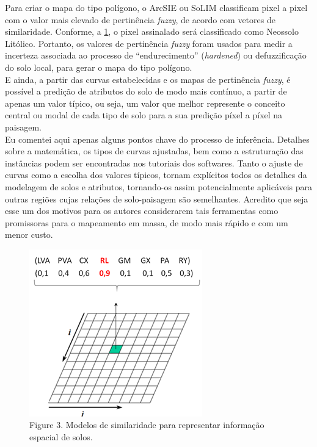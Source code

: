 Para criar o mapa do tipo polígono, o ArcSIE ou SoLIM classificam pixel a pixel com o valor mais elevado de pertinência \emph{fuzzy}, de acordo com vetores de similaridade. Conforme, a \ref{fig:figura3}, o pixel assinalado será classificado como Neossolo Litólico. Portanto, os valores de pertinência \emph{fuzzy} foram usados para medir a incerteza associada ao processo de ``endurecimento'' (\emph{hardened}) ou defuzzificação do solo local, para gerar o mapa do tipo polígono.\\
E ainda, a partir das curvas estabelecidas e os mapas de pertinência \emph{fuzzy}, é possível a predição de atributos do solo de modo mais contínuo, a partir de apenas um valor típico, ou seja, um valor que melhor represente o conceito central ou modal de cada tipo de solo para a sua predição píxel a píxel na paisagem.\\
Eu comentei aqui apenas alguns pontos chave do processo de inferência. Detalhes sobre a matemática, os tipos de curvas ajustadas, bem como a estruturação das instâncias podem ser encontradas nos tutoriais dos softwares. Tanto o ajuste de curvas como a escolha dos valores típicos, tornam explícitos todos os detalhes da modelagem de solos e atributos, tornando-os assim potencialmente aplicáveis para outras regiões cujas relações de solo-paisagem são semelhantes. Acredito que seja esse um dos motivos para os autores considerarem tais ferramentas como promissoras para o mapeamento em massa, de modo mais rápido e com um menor custo.\\
\begin{figure}[htbp]
   \centering
   \includegraphics[scale=0.8]{figuras/figura3.png}
   \caption{Figure 3. Modelos de similaridade para representar informação espacial de solos.}
   \label{fig:figura3}
\end{figure}
